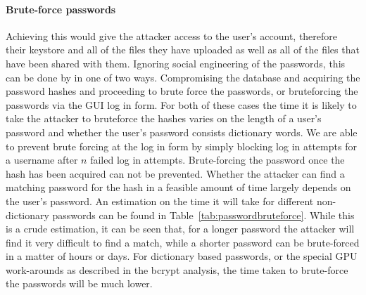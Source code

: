 \documentclass[12pt, titlepage]{article}
\begin{document}
\paragraph*{Brute-force passwords} Achieving this would give the attacker access to the user's account, therefore their keystore and all of the files they have uploaded as well as all of the files that have been shared with them. Ignoring social engineering of the passwords, this can be done by in one of two ways. Compromising the database and acquiring the password hashes and proceeding to brute force the passwords, or bruteforcing the passwords via the GUI log in form. For both of these cases the time it is likely to take the attacker to bruteforce the hashes varies on the length of a user's password and whether the user's password consists dictionary words. We are able to prevent brute forcing at the log in form by simply blocking log in attempts for a username after $n$ failed log in attempts. Brute-forcing the password once the hash has been acquired can not be prevented. Whether the attacker can find a matching password for the hash in a feasible amount of time largely depends on the user's password. An estimation on the time it will take for different non-dictionary passwords can be found in Table~\ref{tab:passwordbruteforce}. While this is a crude estimation, it can be seen that, for a longer password the attacker will find it very difficult to find a match, while a shorter password can be brute-forced in a matter of hours or days. For dictionary based passwords, or the special GPU work-arounds as described in the bcrypt analysis, the time taken to brute-force the passwords will be much lower.
\end{document}

